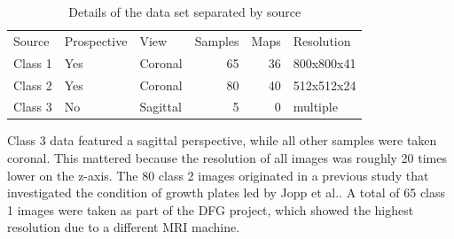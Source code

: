 \begin{table}[h!]
\centering
\begin{tabular}{ | l | l | l | r | r | l |}
  \hline
  Source & Prospective & View & Samples & Maps & Resolution \\
  \Xhline{3\arrayrulewidth}
  Class 1 & Yes        & Coronal     & 65      & 36            & 800x800x41 \\
  \hline
  Class 2 & Yes        & Coronal     & 80      & 40            & 512x512x24 \\
  \hline
  Class 3 & No         & Sagittal    & 5       & 0             & multiple \\
  \hline
\end{tabular}
\caption{Details of the data set separated by source}
\end{table}

Class 3 data featured a sagittal perspective, while all other samples were taken coronal. This mattered because the resolution of all images was roughly 20 times lower on the z-axis. The 80 class 2 images originated in a previous study that investigated the condition of growth plates led by Jopp et al.. A total of 65 class 1 images were taken as part of the DFG project, which showed the highest resolution due to a different MRI machine.

